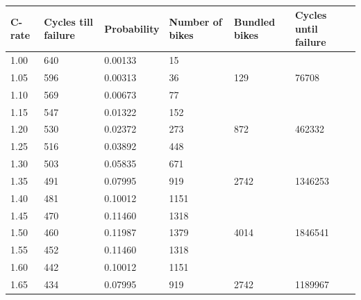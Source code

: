 \documentclass[a4paper, 10pt]{article}
\numberwithin{equation}{section}
\begin{document}
\begin{table}[H]
\centering
\caption{}
\label{tab:optimise_c_rate}
\begin{tabular}{|l|l|l|l|l|l|}
\hline
\textbf{C-rate} & \textbf{Cycles till failure} & \textbf{Probability} & \textbf{Number of bikes} & \textbf{Bundled bikes} & \textbf{Cycles until failure} \\ \hline
\rowcolor[HTML]{C0C0C0} 
1.00   & 640                 & 0.00133     & 15              &               &                       \\ \hline
\rowcolor[HTML]{C0C0C0} 
1.05   & 596                 & 0.00313     & 36              & 129           & 76708                 \\ \hline
\rowcolor[HTML]{C0C0C0} 
1.10   & 569                 & 0.00673     & 77              &               &                       \\ \hline
1.15   & 547                 & 0.01322     & 152             &               &                       \\ \hline
1.20   & 530                 & 0.02372     & 273             & 872           & 462332                \\ \hline
1.25   & 516                 & 0.03892     & 448             &               &                       \\ \hline
\rowcolor[HTML]{C0C0C0} 
1.30   & 503                 & 0.05835     & 671             &               &                       \\ \hline
\rowcolor[HTML]{C0C0C0} 
1.35   & 491                 & 0.07995     & 919             & 2742          & 1346253               \\ \hline
\rowcolor[HTML]{C0C0C0} 
1.40   & 481                 & 0.10012     & 1151            &               &                       \\ \hline
1.45   & 470                 & 0.11460     & 1318            &               &                       \\ \hline
1.50   & 460                 & 0.11987     & 1379            & 4014          & 1846541               \\ \hline
1.55   & 452                 & 0.11460     & 1318            &               &                       \\ \hline
\rowcolor[HTML]{C0C0C0} 
1.60   & 442                 & 0.10012     & 1151            &               &                       \\ \hline
\rowcolor[HTML]{C0C0C0} 
1.65   & 434                 & 0.07995     & 919             & 2742          & 1189967               \\ \hline

\end{tabular}
\end{table}
\end{document}
